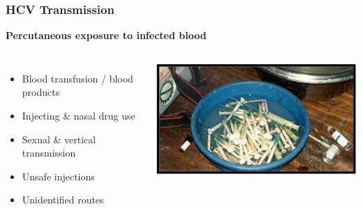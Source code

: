 \begin{frame}
\frametitle{HCV Transmission}
 
\textbf{Percutaneous exposure to infected blood}

\begin{columns}[t]


\begin{itemize}
	\item Blood transfusion / blood products
	\item Injecting \& nasal drug use
	\item Sexual \& vertical transmission
	\item Unsafe injections
	\item Unidentified routes
\end{itemize}


\includegraphics[width=\textwidth]{../../images/Needles}

\end{columns}

\end{frame}

